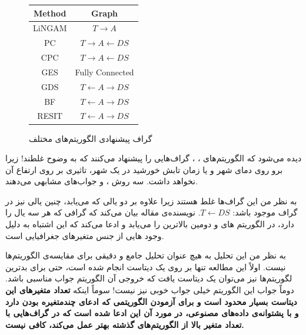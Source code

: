 \documentclass[a4paper,12pt]{article}
\begin{document}
\begin{center}

\begin{figure}
\centering
\begin{latin}
\begin{tabular}{| c| c |}
\hline
Method & Graph \\
\hline\hline
LiNGAM & $T \rightarrow A$ \\
\hline
PC &  $T \rightarrow A \leftarrow DS$ \\
\hline
CPC& $T \rightarrow A \leftarrow DS$ \\
\hline
GES& Fully Connected\\
\hline
GDS& $T \leftarrow A \rightarrow DS$\\
\hline
BF& $T \leftarrow A \rightarrow DS$\\
\hline
RESIT&$T \leftarrow A \rightarrow DS$\\
\hline
\end{tabular}
\end{latin}
\caption{گراف پیشنهادی الگوریتم‌های مختلف}
\end{figure}

\end{center}
دیده می‌شود که الگوریتم‌های 
،
،
گراف‌هایی را پیشنهاد می‌کنند که به وضوح غلطند! زیرا 
برو روی دمای شهر و یا زمان تابش خورشید در یک شهر، تاثیری بر روی ارتفاع آن نخواهد داشت. سه روش 
،
و
جواب‌های مشابهی می‌دهند. 

به نظر من این گراف‌ها غلط هستند زیرا علاوه بر دو یالی که 
می‌یابد،  چنین یالی نیز در گراف موجود باشد: $T \leftarrow DS$. نویسنده‌ی مقاله بیان می‌کند که گرافی که هر سه یال را دارد، در الگوریتم های 
و
دومین بالاترین 
را می‌یابد و ادعا می‌کند که این اشتباه به دلیل وجود 
هایی از جنس متغیر‌های جغرافیایی است. 

به نظر من این تحلیل به هیچ عنوان تحلیل جامع و دقیقی برای مقایسه‌ی الگوریتم‌ها نیست. اولاً این مطالعه تنها بر روی یک دیتاست انجام شده است، حتی برای بدترین لگوریتم‌ها نیز می‌توان یک دیتاست یافت که خروجی آن الگوریتم جواب مناسبی باشد. دوماً جواب این الگوریتم خیلی جواب خوبی نیز نیست! سوماً اینکه 
\textbf{
تعداد متغیر‌های این دیتاست بسیار محدود است و برای آزمودن الگوریتمی که ادعای چندمتغیره بودن دارد و با پشتوانه‌ی داده‌های مصنوعی، در مورد آن این ادعا شده است که در گراف‌هایی با تعداد متغیر بالا از الگوریتم‌های گذشته بهتر عمل می‌کند، کافی نیست.}




\end{document}
